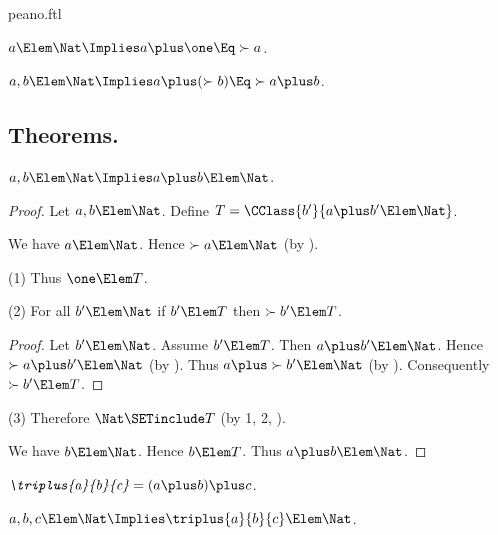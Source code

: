 \documentclass{stex}
\begin{document}
\begin{smodule}{peano.ftl}
\begin{forthel}
  \begin{axiom*}
    $a \Elem \Nat \Implies a \plus \one \Eq \succ{a}$.
  \end{axiom*}

  \begin{axiom*}[title=18,name=P18]
    $a,b \Elem \Nat \Implies a \plus (\succ{b}) \Eq \succ{a \plus b}$.
  \end{axiom*}
\end{forthel}


\subsection{Theorems.}


\begin{forthel}
  \begin{theorem*}[title=19,name=P19]
    $a,b \Elem \Nat \Implies a \plus b \Elem \Nat$.
  \end{theorem*}
  \begin{proof}
    Let $a,b \Elem \Nat$.
    Define $T = \CClass{b'}{a \plus b' \Elem \Nat}$.
    
    We have $a \Elem \Nat$.
    Hence $\succ{a} \Elem \Nat$ (by ).
    
    (1) Thus $\one \Elem T$.

    (2) For all $b' \Elem \Nat$ if $b' \Elem T$ then $\succ{b'} \Elem T$.
    \begin{proof}
      Let $b' \Elem \Nat$.
      Assume $b' \Elem T$.
      Then $a \plus b' \Elem \Nat$.
      Hence $\succ{a \plus b'} \Elem \Nat$ (by ).
      Thus $a \plus \succ{b'} \Elem \Nat$ (by ).
      Consequently $\succ{b'} \Elem T$.
    \end{proof}

    (3) Therefore $\Nat \SETinclude T$ (by 1, 2, ).

    We have $b \Elem \Nat$.
    Hence $b \Elem T$.
    Thus $a \plus b \Elem \Nat$.
  \end{proof}

  \begin{definition*}[title=20,for=triplus]
    $\emph{\triplus{a}{b}{c}} = (a \plus b) \plus c$.
  \end{definition*}

  \begin{theorem*}[title=21,name=P21]
    $a,b,c \Elem \Nat \Implies \triplus{a}{b}{c} \Elem \Nat$.
  \end{theorem*}


\end{forthel}
\end{smodule}
\end{document}
